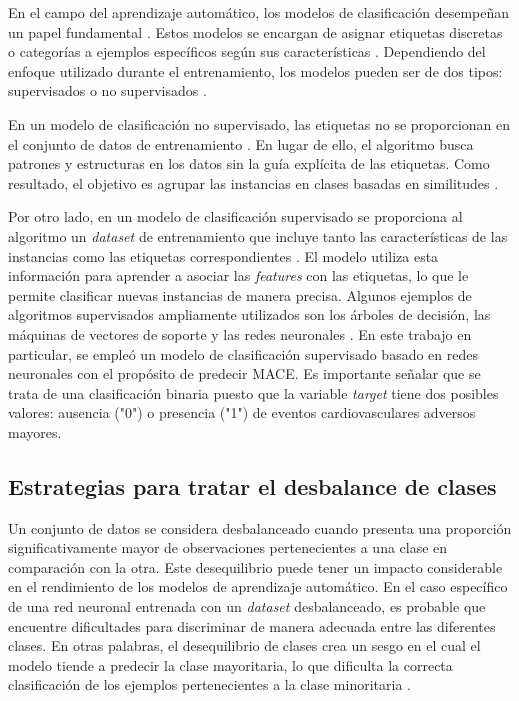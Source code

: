 En el campo del aprendizaje automático, los modelos de clasificación desempeñan un papel fundamental 
\citep{CITE:32}. Estos modelos se encargan de asignar etiquetas discretas o categorías a ejemplos 
específicos según sus características \citep{CITE:33}. Dependiendo del enfoque utilizado durante el 
entrenamiento, los modelos pueden ser de dos tipos: supervisados o no supervisados \citep{CITE:35}.

En un modelo de clasificación no supervisado, las etiquetas no se proporcionan en el conjunto de 
datos de entrenamiento \citep{CITE:34}. En lugar de ello, el algoritmo busca patrones y estructuras 
en los datos sin la guía explícita de las etiquetas. Como resultado, el objetivo es agrupar las instancias en 
clases basadas en similitudes \citep{CITE:33}.

Por otro lado, en un modelo de clasificación supervisado se proporciona al algoritmo un \emph{dataset} de 
entrenamiento que incluye tanto las características de las instancias como las etiquetas correspondientes 
\citep{CITE:33}. El modelo utiliza esta información para aprender a asociar las \emph{features} con las 
etiquetas, lo que le permite clasificar nuevas instancias de manera precisa. Algunos ejemplos de algoritmos 
supervisados ampliamente utilizados son los árboles de decisión, las máquinas de vectores de soporte y 
las redes neuronales \citep{CITE:34}. En este trabajo en particular, se empleó un modelo de clasificación 
supervisado basado en redes neuronales con el propósito de predecir MACE. Es importante señalar que se trata
de una clasificación binaria puesto que la variable \emph{target} tiene dos posibles valores: ausencia ("0") o 
presencia ("1") de eventos cardiovasculares adversos mayores.

\subsection{Estrategias para tratar el desbalance de clases}

Un conjunto de datos se considera desbalanceado cuando presenta una proporción significativamente mayor 
de observaciones pertenecientes a una clase en comparación con la otra. Este desequilibrio puede tener 
un impacto considerable en el rendimiento de los modelos de aprendizaje automático. En el caso específico 
de una red neuronal entrenada con un \emph{dataset} desbalanceado, es probable que encuentre dificultades 
para discriminar de manera adecuada entre las diferentes clases. En otras palabras, el desequilibrio de 
clases crea un sesgo en el cual el modelo tiende a predecir la clase mayoritaria, lo que dificulta la 
correcta clasificación de los ejemplos pertenecientes a la clase minoritaria \citep{CITE:36} \citep{CITE:37}. 


